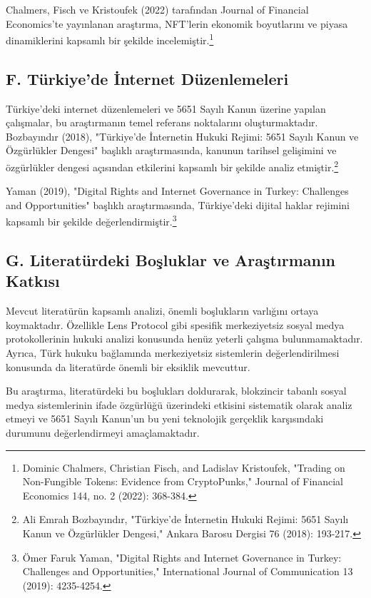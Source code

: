 \documentclass[11pt,a4paper]{article}
\begin{document}
Chalmers, Fisch ve Kristoufek (2022) tarafından Journal of Financial Economics'te yayınlanan araştırma, NFT'lerin ekonomik boyutlarını ve piyasa dinamiklerini kapsamlı bir şekilde incelemiştir.\footnote{Dominic Chalmers, Christian Fisch, and Ladislav Kristoufek, "Trading on Non-Fungible Tokens: Evidence from CryptoPunks," Journal of Financial Economics 144, no. 2 (2022): 368-384.}

\subsection*{\fontsize{12}{14}\selectfont\bfseries F. Türkiye'de İnternet Düzenlemeleri}

Türkiye'deki internet düzenlemeleri ve 5651 Sayılı Kanun üzerine yapılan çalışmalar, bu araştırmanın temel referans noktalarını oluşturmaktadır. Bozbayındır (2018), "Türkiye'de İnternetin Hukuki Rejimi: 5651 Sayılı Kanun ve Özgürlükler Dengesi" başlıklı araştırmasında, kanunun tarihsel gelişimini ve özgürlükler dengesi açısından etkilerini kapsamlı bir şekilde analiz etmiştir.\footnote{Ali Emrah Bozbayındır, "Türkiye'de İnternetin Hukuki Rejimi: 5651 Sayılı Kanun ve Özgürlükler Dengesi," Ankara Barosu Dergisi 76 (2018): 193-217.}

Yaman (2019), "Digital Rights and Internet Governance in Turkey: Challenges and Opportunities" başlıklı araştırmasında, Türkiye'deki dijital haklar rejimini kapsamlı bir şekilde değerlendirmiştir.\footnote{Ömer Faruk Yaman, "Digital Rights and Internet Governance in Turkey: Challenges and Opportunities," International Journal of Communication 13 (2019): 4235-4254.}

\subsection*{\fontsize{12}{14}\selectfont\bfseries G. Literatürdeki Boşluklar ve Araştırmanın Katkısı}

Mevcut literatürün kapsamlı analizi, önemli boşlukların varlığını ortaya koymaktadır. Özellikle Lens Protocol gibi spesifik merkeziyetsiz sosyal medya protokollerinin hukuki analizi konusunda henüz yeterli çalışma bulunmamaktadır. Ayrıca, Türk hukuku bağlamında merkeziyetsiz sistemlerin değerlendirilmesi konusunda da literatürde önemli bir eksiklik mevcuttur.

Bu araştırma, literatürdeki bu boşlukları doldurarak, blokzincir tabanlı sosyal medya sistemlerinin ifade özgürlüğü üzerindeki etkisini sistematik olarak analiz etmeyi ve 5651 Sayılı Kanun'un bu yeni teknolojik gerçeklik karşısındaki durumunu değerlendirmeyi amaçlamaktadır.
\end{document}
